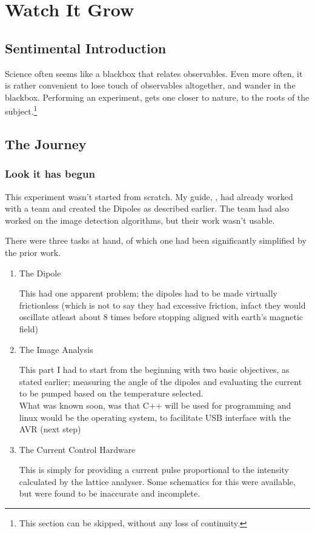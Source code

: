 \chapter{Watch It Grow}

\section{Sentimental Introduction}
	Science often seems like a blackbox that relates observables. Even more often, it is rather convenient to lose touch of observables altogether, and wander in the blackbox. Performing an experiment, gets one closer to nature, to the roots of the subject.\footnote{This section can be skipped, without any loss of continuity.}

\section{The Journey}
	\subsection{Look it has begun}
		This experiment wasn't started from scratch. My guide, \myProf, had already worked with a team and created the Dipoles as described earlier. The team had also worked on the image detection algorithms, but their work wasn't usable.
		\par
		There were three tasks at hand, of which one had been significantly simplified by the prior work.
		\begin{enumerate}
			\item The Dipole
					\par
					This had one apparent problem; the dipoles had to be made virtually frictionless (which is not to say they had excessive friction, infact they would oscillate atleast about 8 times before stopping aligned with earth's magnetic field)
			\item The Image Analysis
					\par
					This part I had to start from the beginning with two basic objectives, as stated earlier; measuring the angle of the dipoles and evaluating the current to be pumped based on the temperature selected.\\
					What was known soon, was that C++ will be used for programming and linux would be the operating system, to facilitate USB interface with the AVR (next step)
			\item The Current Control Hardware
					\par
					This is simply for providing a current pulse proportional to the intensity calculated by the lattice analyser. Some schematics for this were available, but were found to be inaccurate and incomplete.
		\end{enumerate}
	

